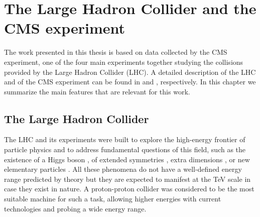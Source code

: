\chapter{The Large Hadron Collider and the CMS experiment}
\label{sec:chap_2}

The work presented in this thesis is based on data collected by the CMS experiment, 
one of the four main experiments together studying the collisions 
provided by the Large Hadron Collider (LHC). A detailed description of the LHC and of the CMS 
experiment can be found in \cite{Evans:2006tq} and \cite{Chatrchyan:2008aa}, respectively.
In this chapter we summarize the main features that are relevant for this work.

\section{The Large Hadron Collider}

The LHC and its experiments were built to explore the high-energy frontier of particle physics and to address fundamental questions of this field, such as the existence of a Higgs boson \cite{Englert:1964et,Higgs:1964ia,Higgs:1964pj,Guralnik:1964eu,Higgs:1966ev,Kibble:1967sv}, of extended symmetries \cite{Martin:1997ns}, extra dimensions \cite{Antoniadis:1999bq}, or new elementary particles \cite{Beltran:2010ww,Randall:1999vf}. All these phenomena do not have a well-defined energy range predicted by theory but they are expected to manifest at the TeV scale in case they exist in nature. A proton-proton collider was considered to be the most suitable machine for such a task, allowing higher energies with current technologies and probing a wide energy range.%

